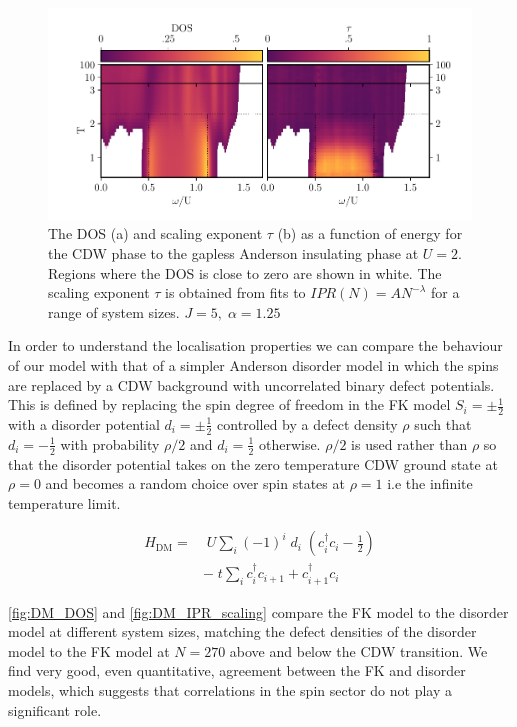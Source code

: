 \hypertarget{fig:gap_opening_U2}{%
\begin{figure}
\centering
\includegraphics[width=1\textwidth,height=\textheight]{figure_code/fk_chapter/gap_opening/gap_opening_U2}
\caption[{The transition from CDW to the Anderson Phase}]{The DOS (a) and scaling exponent \(\tau\) (b) as a function of energy for the CDW phase to the gapless Anderson insulating phase at \(U=2\). Regions where the DOS is close to zero are shown in white. The scaling exponent \(\tau\) is obtained from fits to \(IPR(N) = A N^{-\lambda}\) for a range of system sizes. \(J = 5,\;\alpha = 1.25\)}
\label{fig:gap_opening_U2}
\end{figure}
}

In order to understand the localisation properties we can compare the behaviour of our model with that of a simpler Anderson disorder model in which the spins are replaced by a CDW background with uncorrelated binary defect potentials. This is defined by replacing the spin degree of freedom in the FK model \(S_i = \pm \tfrac{1}{2}\) with a disorder potential \(d_i = \pm \tfrac{1}{2}\) controlled by a defect density \(\rho\) such that \(d_i = -\tfrac{1}{2}\) with probability \(\rho/2\) and \(d_i = \tfrac{1}{2}\) otherwise. \(\rho/2\) is used rather than \(\rho\) so that the disorder potential takes on the zero temperature CDW ground state at \(\rho = 0\) and becomes a random choice over spin states at \(\rho = 1\) i.e the infinite temperature limit.

\[\begin{aligned}
H_{\mathrm{DM}} = & \;U \sum_{i} (-1)^i \; d_i \;(c^\dagger_{i}c_{i} - \tfrac{1}{2}) \\
& -\;t \sum_{i} c^\dagger_{i}c_{i+1} + c^\dagger_{i+1}c_{i}
\end{aligned}\]

\cref{fig:DM_DOS} and \cref{fig:DM_IPR_scaling} compare the FK model to the disorder model at different system sizes, matching the defect densities of the disorder model to the FK model at \(N = 270\) above and below the CDW transition. We find very good, even quantitative, agreement between the FK and disorder models, which suggests that correlations in the spin sector do not play a significant role.


